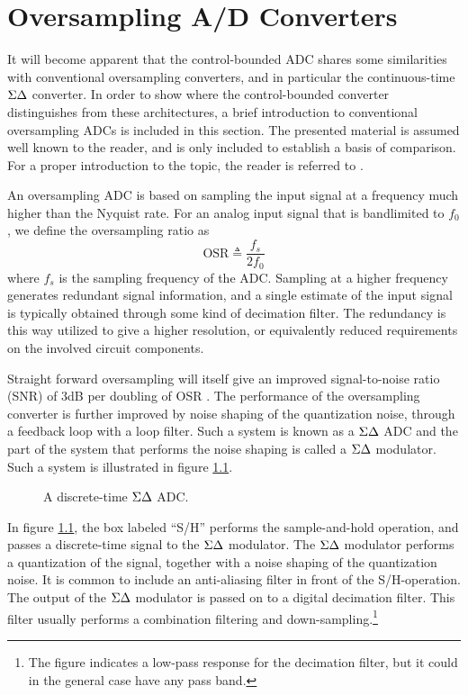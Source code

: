 
\chapter{Oversampling A/D Converters}
\label{sec:theory}
It will become apparent that the control-bounded ADC shares some similarities with conventional oversampling converters, and in particular the continuous-time $\Sigma\Delta$ converter. In order to show where the control-bounded converter distinguishes from these architectures, a brief introduction to conventional oversampling ADCs is included in this section. The presented material is assumed well known to the reader, and is only included to establish a basis of comparison. For a proper introduction to the topic, the reader is referred to \cite{johns_martin}.

An oversampling ADC is based on sampling the input signal at a frequency much higher than the Nyquist rate. For an analog input signal that is bandlimited to $f_0$, we define the oversampling ratio as
\begin{equation}
    \text{OSR} \triangleq \frac{f_s}{2f_0}
\end{equation}
where $f_s$ is the sampling frequency of the ADC. Sampling at a higher frequency generates redundant signal information, and a single estimate of the input signal is typically obtained through some kind of decimation filter. The redundancy is this way utilized to give a higher resolution, or equivalently reduced requirements on the involved circuit components.

Straight forward oversampling will itself give an improved signal-to-noise ratio (SNR) of 3dB per doubling of OSR \cite{johns_martin}. The performance of the oversampling converter is further improved by noise shaping of the quantization noise, through a feedback loop with a loop filter. Such a system is known as a $\Sigma\Delta$ ADC and the part of the system that performs the noise shaping is called a $\Sigma\Delta$ modulator. Such a system is illustrated in figure \ref{fig:dtsdmod}.
\begin{figure}[htbp]
    
    \centering
    \caption{A discrete-time $\Sigma\Delta$ ADC.}
    \label{fig:dtsdmod}
\end{figure}
In figure \ref{fig:dtsdmod}, the box labeled \enquote{S/H} performs the sample-and-hold operation, and passes a discrete-time signal to the $\Sigma\Delta$ modulator. The $\Sigma\Delta$ modulator performs a quantization of the signal, together with a noise shaping of the quantization noise. It is common to include an anti-aliasing filter in front of the S/H-operation. The output of the $\Sigma\Delta$ modulator is passed on to a digital decimation filter. This filter usually performs a combination filtering and down-sampling.\footnote{The figure indicates a low-pass response for the decimation filter, but it could in the general case have any pass band.}

